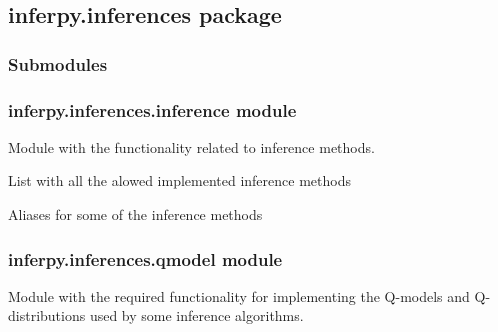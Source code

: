 \documentclass[letterpaper,10pt,english]{sphinxmanual}
\begin{document}
\subsection{inferpy.inferences package}
\label{\detokenize{modules/inferpy.inferences::doc}}\label{\detokenize{modules/inferpy.inferences:inferpy-inferences-package}}

\subsubsection{Submodules}
\label{\detokenize{modules/inferpy.inferences:submodules}}

\subsubsection{inferpy.inferences.inference module}
\label{\detokenize{modules/inferpy.inferences:inferpy-inferences-inference-module}}\label{\detokenize{modules/inferpy.inferences:module-inferpy.inferences.inference}}
Module with the functionality related to inference methods.

\begin{fulllineitems}
\label{\detokenize{modules/inferpy.inferences:inferpy.inferences.inference.INF_METHODS}}
List with all the alowed implemented inference methods

\end{fulllineitems}


\begin{fulllineitems}
\label{\detokenize{modules/inferpy.inferences:inferpy.inferences.inference.INF_METHODS_ALIAS}}
Aliases for some of the inference methods

\end{fulllineitems}



\subsubsection{inferpy.inferences.qmodel module}
\label{\detokenize{modules/inferpy.inferences:inferpy-inferences-qmodel-module}}\label{\detokenize{modules/inferpy.inferences:module-inferpy.inferences.qmodel}}
Module with the required functionality for implementing the Q-models and Q-distributions used by
some inference algorithms.
\end{document}
